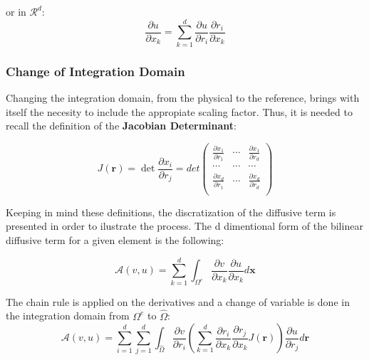 \documentclass[
]{scrartcl}
\begin{document}
or in \(\mathcal{R}^{d}\): \begin{equation}
    \frac{\partial u}{\partial x_k}=\sum_{k=1}^{d}\frac{\partial u}{\partial r_i}\frac{\partial r_i}{\partial x_k}
\end{equation}

\hypertarget{change-of-integration-domain-1}{%
\subsubsection{Change of Integration
Domain}\label{change-of-integration-domain-1}}

Changing the integration domain, from the physical to the reference,
brings with itself the necesity to include the appropiate scaling
factor. Thus, it is needed to recall the definition of the
\textbf{Jacobian Determinant}:

\begin{equation}
    J(\textbf{r})=\det\frac{\partial x_i}{\partial r_j}=det
    \begin{pmatrix}
    \frac{\partial x_1}{\partial r_1} & \cdots & \frac{\partial x_1}{\partial r_d}\\
    \cdots & \cdots & \cdots\\
    \frac{\partial x_d}{\partial r_1} & \cdots & \frac{\partial x_d}{\partial r_d}\\
\end{pmatrix}
\end{equation}

Keeping in mind these definitions, the discratization of the diffusive
term is presented in order to ilustrate the process. The d dimentional
form of the bilinear diffusive term for a given element is the
following:

\begin{equation}
    \mathcal{A}(v,u)=\sum_{k=1}^{d} \int_{\Omega^{e}} \frac{\partial v}{\partial x_k}\frac{\partial u}{\partial x_k} d\textbf{x} 
\end{equation}

The chain rule is applied on the derivatives and a change of variable is
done in the integration domain from \(\Omega^{e}\) to \(\hat{\Omega}\):
\begin{equation}
    \mathcal{A}(v,u)=\sum_{i=1}^{d} \sum_{j=1}^{d} \int_{\hat{\Omega}} \frac{\partial v}{\partial r_i} (\sum_{k=1}^{d}\frac{\partial r_i}{\partial x_k}\frac{\partial r_j}{\partial x_k} J(\textbf{r})) \frac{\partial u}{\partial r_j} d\textbf{r} 
\end{equation}
\end{document}
